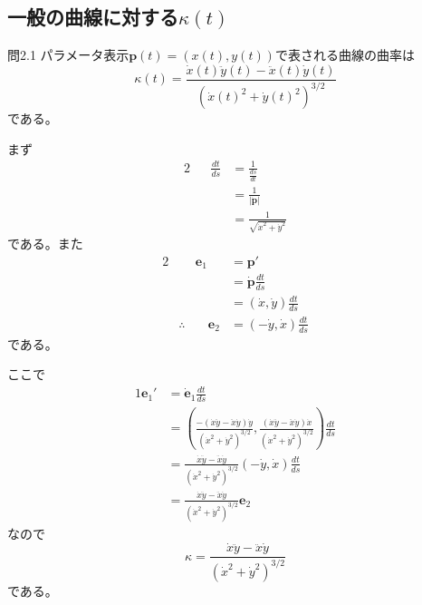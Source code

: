 \documentclass[a4j,disablejfam,dvipdfmx,papersize,slide,uplatex,21pt]{jsarticle}
\makeatletter
\renewenvironment{proof}[1][\proofname]{\par
        \pushQED{\qed}
        \normalfont
        \topsep6\p@\@plus6\p@ \trivlist
        \item[\hskip\labelsep{\bfseries #1}\@addpunct{\bfseries}]\ignorespaces
    }{%
        \popQED\endtrivlist\@endpefalse
    }
\renewcommand{\proofname}{証明.}
\makeatother
\begin{document}
\newpage
\subsection*{一般の曲線に対する$\kappa(t)$}
\begin{itembox}[l]{問2.1}
    パラメータ表示$\bm{p}(t) = (x(t), y(t))$で表される曲線の曲率は
    \begin{equation}
        \kappa(t) = \frac{\dot{x}(t) \ddot{y}(t) - \ddot{x}(t) \dot{y}(t)}{(\dot{x}(t)^2 + \dot{y}(t)^2)^{3/2}}
    \end{equation}
    である。
\end{itembox}

\newpage
\begin{proof}
    まず
    \begin{alignat}{2}
        && \frac{dt}{ds} &= \frac{1}{\frac{ds}{dt}} \\
            &&&= \frac{1}{|\dot{\bm{p}}|} \\
            &&&= \frac{1}{\sqrt{\dot{x}^2 + \dot{y}^2}}
    \end{alignat}
    である。また
    \begin{alignat}{2}
        &&\bm{e}_1 &= \bm{p}' \\
            &&&= \dot{\bm{p}} \frac{dt}{ds} \\
            &&&= (\dot{x}, \dot{y}) \frac{dt}{ds} \\
        &\therefore& \quad \bm{e}_2 &= (-\dot{y}, \dot{x}) \frac{dt}{ds}
    \end{alignat}
    である。

    \newpage
    ここで
    \begin{alignat}{1}
        \bm{e}_1' &= \dot{\bm{e}}_1 \frac{dt}{ds} \\
            &= \left(
                \frac{-(\dot{x}\ddot{y} - \ddot{x}\dot{y}) \dot{y}}{(\dot{x}^2 + \dot{y}^2)^{3/2}},
                \frac{ (\dot{x}\ddot{y} - \ddot{x}\dot{y}) \dot{x}}{(\dot{x}^2 + \dot{y}^2)^{3/2}}
            \right) \frac{dt}{ds} \\
            &= \frac{\dot{x}\ddot{y} - \ddot{x}\dot{y}}{(\dot{x}^2 + \dot{y}^2)^{3/2}}
            \left(
                -\dot{y},
                 \dot{x}
            \right) \frac{dt}{ds} \\
            &= \frac{\dot{x}\ddot{y} - \ddot{x}\dot{y}}{(\dot{x}^2 + \dot{y}^2)^{3/2}}
                \bm{e}_2
    \end{alignat}
    なので
    \begin{equation}
        \kappa = \frac{\dot{x}\ddot{y} - \ddot{x}\dot{y}}{(\dot{x}^2 + \dot{y}^2)^{3/2}}
    \end{equation}
    である。
\end{proof}
\end{document}

